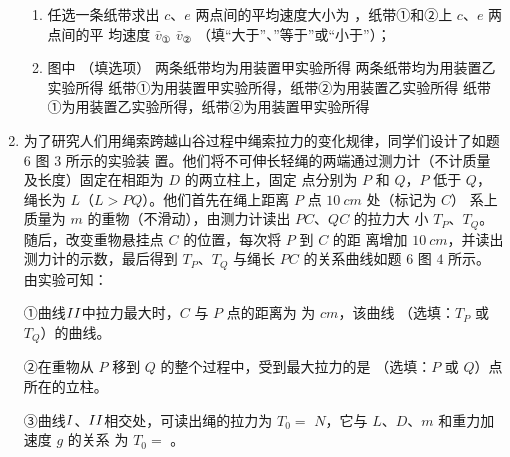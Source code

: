 \begin{enumerate}
\begin{enumerate}
\item 
任选一条纸带求出 $ c $、$ e $ 两点间的平均速度大小为  ，纸带①和②上 $ c $、$ e $ 两点间的平
均速度 $ \bar{v}_{ \text{①} } $ 
$ \bar{v}_{ \text{②} } $ （填“大于”、”等于”或“小于”）；

\item 
图中  （填选项）
\fourchoices
{两条纸带均为用装置甲实验所得}
{两条纸带均为用装置乙实验所得}
{纸带①为用装置甲实验所得，纸带②为用装置乙实验所得}
{纸带①为用装置乙实验所得，纸带②为用装置甲实验所得}


\end{enumerate}






\newpage
\item
{}
为了研究人们用绳索跨越山谷过程中绳索拉力的变化规律，同学们设计了如题 $ 6 $ 图 $ 3 $ 所示的实验装
置。他们将不可伸长轻绳的两端通过测力计（不计质量及长度）固定在相距为 $ D $ 的两立柱上，固定
点分别为 $ P $ 和 $ Q $，$ P $ 低于 $ Q $，绳长为 $ L $（$ L>PQ $）。他们首先在绳上距离 $ P $ 点 $ 10 \ cm $ 处（标记为 $ C $）
系上质量为 $ m $ 的重物（不滑动），由测力计读出 $ PC $、$ QC $ 的拉力大
小 $ T_P $、$ T_Q $。随后，改变重物悬挂点 $ C $ 的位置，每次将 $ P $ 到 $ C $ 的距
离增加 $ 10 \ cm $，并读出测力计的示数，最后得到 $ T_P $、$ T_Q $ 与绳长 $ PC $
的关系曲线如题 $ 6 $ 图 $ 4 $ 所示。由实验可知：
\begin{figure}[h!]
\centering
 \qquad 
\end{figure}



①曲线$ \lmd{2} $中拉力最大时，$ C $ 与 $ P $ 点的距离为
为
$ cm $，该曲线  
（选填：$ T_P $ 或 $ T_Q $）的曲线。



②在重物从 $ P $ 移到 $ Q $ 的整个过程中，受到最大拉力的是  
（选填：$ P $ 或 $ Q $）点所在的立柱。


③曲线$ \lmd{1} $、$ \lmd{2} $相交处，可读出绳的拉力为 $ T_0= $  $ N $，它与 $ L $、$ D $、$ m $ 和重力加速度 $ g $ 的关系
为 $ T_0= $  。 







\end{enumerate}
